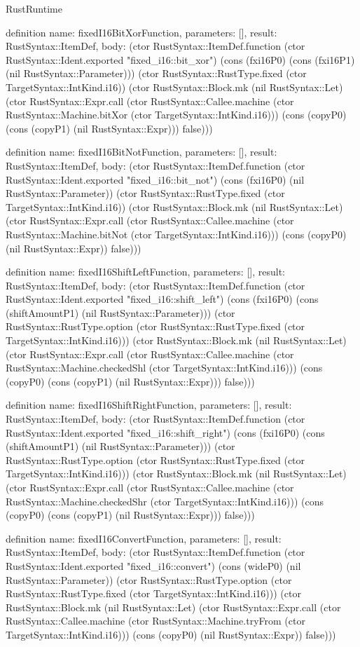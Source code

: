 \begin{lexlean}{RustRuntime}
\begin{semanticmodule}
definition{
  name: fixedI16BitXorFunction,
  parameters: [],
  result: RustSyntax::ItemDef,
  body: (ctor RustSyntax::ItemDef.function (ctor RustSyntax::Ident.exported "fixed_i16::bit_xor") (cons (fxi16P0) (cons (fxi16P1) (nil RustSyntax::Parameter))) (ctor RustSyntax::RustType.fixed (ctor TargetSyntax::IntKind.i16)) (ctor RustSyntax::Block.mk (nil RustSyntax::Let) (ctor RustSyntax::Expr.call (ctor RustSyntax::Callee.machine (ctor RustSyntax::Machine.bitXor (ctor TargetSyntax::IntKind.i16))) (cons (copyP0) (cons (copyP1) (nil RustSyntax::Expr))) false)))
}

definition{
  name: fixedI16BitNotFunction,
  parameters: [],
  result: RustSyntax::ItemDef,
  body: (ctor RustSyntax::ItemDef.function (ctor RustSyntax::Ident.exported "fixed_i16::bit_not") (cons (fxi16P0) (nil RustSyntax::Parameter)) (ctor RustSyntax::RustType.fixed (ctor TargetSyntax::IntKind.i16)) (ctor RustSyntax::Block.mk (nil RustSyntax::Let) (ctor RustSyntax::Expr.call (ctor RustSyntax::Callee.machine (ctor RustSyntax::Machine.bitNot (ctor TargetSyntax::IntKind.i16))) (cons (copyP0) (nil RustSyntax::Expr)) false)))
}

definition{
  name: fixedI16ShiftLeftFunction,
  parameters: [],
  result: RustSyntax::ItemDef,
  body: (ctor RustSyntax::ItemDef.function (ctor RustSyntax::Ident.exported "fixed_i16::shift_left") (cons (fxi16P0) (cons (shiftAmountP1) (nil RustSyntax::Parameter))) (ctor RustSyntax::RustType.option (ctor RustSyntax::RustType.fixed (ctor TargetSyntax::IntKind.i16))) (ctor RustSyntax::Block.mk (nil RustSyntax::Let) (ctor RustSyntax::Expr.call (ctor RustSyntax::Callee.machine (ctor RustSyntax::Machine.checkedShl (ctor TargetSyntax::IntKind.i16))) (cons (copyP0) (cons (copyP1) (nil RustSyntax::Expr))) false)))
}

definition{
  name: fixedI16ShiftRightFunction,
  parameters: [],
  result: RustSyntax::ItemDef,
  body: (ctor RustSyntax::ItemDef.function (ctor RustSyntax::Ident.exported "fixed_i16::shift_right") (cons (fxi16P0) (cons (shiftAmountP1) (nil RustSyntax::Parameter))) (ctor RustSyntax::RustType.option (ctor RustSyntax::RustType.fixed (ctor TargetSyntax::IntKind.i16))) (ctor RustSyntax::Block.mk (nil RustSyntax::Let) (ctor RustSyntax::Expr.call (ctor RustSyntax::Callee.machine (ctor RustSyntax::Machine.checkedShr (ctor TargetSyntax::IntKind.i16))) (cons (copyP0) (cons (copyP1) (nil RustSyntax::Expr))) false)))
}

definition{
  name: fixedI16ConvertFunction,
  parameters: [],
  result: RustSyntax::ItemDef,
  body: (ctor RustSyntax::ItemDef.function (ctor RustSyntax::Ident.exported "fixed_i16::convert") (cons (wideP0) (nil RustSyntax::Parameter)) (ctor RustSyntax::RustType.option (ctor RustSyntax::RustType.fixed (ctor TargetSyntax::IntKind.i16))) (ctor RustSyntax::Block.mk (nil RustSyntax::Let) (ctor RustSyntax::Expr.call (ctor RustSyntax::Callee.machine (ctor RustSyntax::Machine.tryFrom (ctor TargetSyntax::IntKind.i16))) (cons (copyP0) (nil RustSyntax::Expr)) false)))
}


\end{semanticmodule}
\end{lexlean}
